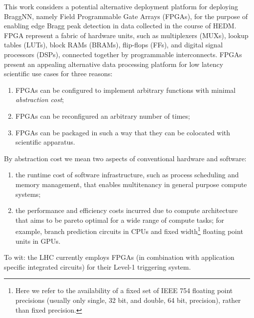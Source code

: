 This work considers a potential alternative deployment platform for deploying BraggNN, namely Field Programmable Gate Arrays (FPGAs), for the purpose of enabling edge Bragg peak detection in data collected in the course of HEDM.
FPGA represent a fabric of hardware units, such as multiplexers (MUXs), lookup tables (LUTs), block RAMs (BRAMs), flip-flops (FFs), and digital signal processors (DSPs), connected together by programmable interconnects.
FPGAs present an appealing alternative data processing platform for low latency scientific use cases for three reasons:
\begin{enumerate}
	\item FPGAs can be configured to implement arbitrary functions with minimal \emph{abstraction cost};
	\item FPGAs can be reconfigured an arbitrary number of times;
	\item FPGAs can be packaged in such a way that they can be colocated with scientific apparatus.
\end{enumerate}
By abstraction cost we mean two aspects of conventional hardware and software:
\begin{enumerate}
	\item the runtime cost of software infrastructure, such as process scheduling and memory management, that enables multitenancy in general purpose compute systems;
	\item the performance and efficiency costs incurred due to compute architecture that aims to be pareto optimal for a wide range of compute tasks; for example, branch prediction circuits in CPUs and fixed width\footnote{Here we refer to the availability of a fixed set of IEEE 754 floating point precisions (usually only single, 32 bit, and double, 64 bit, precision), rather than fixed precision.} floating point units in GPUs.
\end{enumerate}
To wit: the LHC currently employs FPGAs (in combination with application specific integrated circuits) for their Level-1 triggering system.

